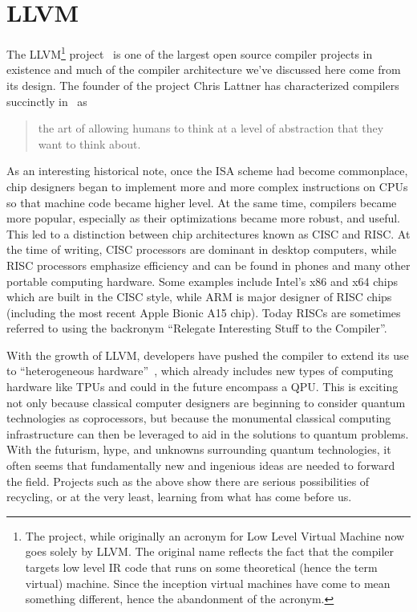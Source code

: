 \section{LLVM}\label{sec:llvm}

The LLVM\footnote{The project, while originally an acronym for Low Level Virtual Machine now goes solely by LLVM. The original name reflects the fact that the compiler targets low level \ac{IR} code that runs on some theoretical (hence the term virtual) machine. Since the inception virtual machines have come to mean something different, hence the abandonment of the acronym.} project~\cite{llvm} is one of the largest open source compiler projects in existence and much of the compiler architecture we've discussed here come from its design.
The founder of the project Chris Lattner has characterized compilers succinctly in~\cite{lattnerquote} as
\begin{quote}
    the art of allowing humans to think at a level of abstraction that they want to think about.
\end{quote}

As an interesting historical note, once the \ac{ISA} scheme had become commonplace, chip designers began to implement more and more complex instructions on \acp{CPU} so that machine code became higher level.
At the same time, compilers became more popular, especially as their optimizations became more robust, and useful.
This led to a distinction between chip architectures known as \ac{CISC} and \ac{RISC}.
At the time of writing, \ac{CISC} processors are dominant in desktop computers, while \ac{RISC} processors emphasize efficiency and can be found in phones and many other portable computing hardware.
Some examples include Intel's x86 and x64 chips which are built in the \ac{CISC} style, while ARM is major designer of \ac{RISC} chips (including the most recent Apple Bionic A15 chip). %
Today \acp{RISC} are sometimes referred to using the backronym ``Relegate Interesting Stuff to the Compiler''.

With the growth of LLVM, developers have pushed the compiler to extend its use to ``heterogeneous hardware''~\cite{mlir}, which already includes new types of computing hardware like \acp{TPU} and could in the future encompass a \ac{QPU}.
This is exciting not only because classical computer designers are beginning to consider quantum technologies as coprocessors, but because the monumental classical computing infrastructure can then be leveraged to aid in the solutions to quantum problems.
With the futurism, hype, and unknowns surrounding quantum technologies, it often seems that fundamentally new and ingenious ideas are needed to forward the field.
Projects such as the above show there are serious possibilities of recycling, or at the very least, learning from what has come before us.
